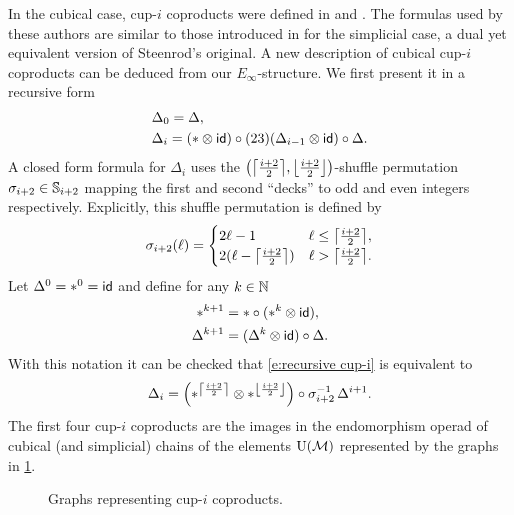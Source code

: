 In the cubical case, cup-$i$ coproducts were defined in \cite{kadeishvili1999coproducts} and \cite{pilarczyk2016cubical}.
The formulas used by these authors are similar to those introduced in \cite{medina2023fast_sq} for the simplicial case, a dual yet equivalent version of Steenrod's original.
A new description of cubical cup-$i$ coproducts can be deduced from our $E_\infty$-structure.
We first present it in a recursive form
\begin{equation} \label{e:recursive cup-i}
	\begin{split}
		& \Delta_0 = \Delta, \\
		& \Delta_i =
		(\ast \ot \id) \circ (23)(\Delta_{i-1} \ot \id) \circ \Delta.
	\end{split}
\end{equation}
A closed form formula for $\Delta_i$ uses the $\big(\ceil*{\frac{i+2}{2}}, \floor*{\frac{i+2}{2}}\big)$-shuffle permutation $\sigma_{i+2} \in \sym_{i+2}$ mapping the first and second ``decks'' to odd and even integers respectively.
Explicitly, this shuffle permutation is defined by
\begin{equation} \label{e:shuffle perm}
	\sigma_{i+2}(\ell) =
	\begin{cases}
		2\ell-1 & \ell \leq \ceil*{\frac{i+2}{2}}, \\
		2(\ell-\ceil*{\frac{i+2}{2}}) & \ell > \ceil*{\frac{i+2}{2}}.
	\end{cases}
\end{equation}
Let $\Delta^0 = \ast^0 = \id$ and define for any $k \in \N$
\begin{equation} \label{e:iterated comb}
	\begin{split}
		\ast^{k+1} &= \ast \circ (\ast^k \ot \id), \\
		\Delta^{k+1} &= (\Delta^k \ot \id) \circ \Delta.
	\end{split}
\end{equation}
With this notation it can be checked that \cref{e:recursive cup-i} is equivalent to
\begin{equation} \label{e:closed cup-i}
	\Delta_i = \left(\ast^{\ceil*{\frac{i+2}{2}}} \ot \ast^{\floor*{\frac{i+2}{2}}}\right) \circ \sigma_{i+2}^{-1} \, \Delta^{i+1}.
\end{equation}
The first four cup-$i$ coproducts are the images in the endomorphism operad of cubical (and simplicial) chains of the elements $\UM$ represented by the graphs in \cref{f:cup-i}.

\begin{figure}[h!]
	\centering
	
	\caption{Graphs representing cup-$i$ coproducts.}
	\label{f:cup-i}
\end{figure}

